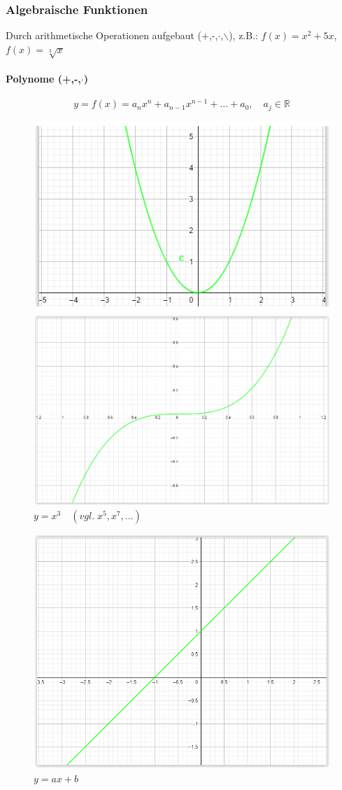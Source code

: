 \documentclass[12pt,a4paper]{report}%
\numberwithin{equation}{section}
\newcommand{\R}{\mathbb{R}} %
\newcommand{\subsubsubsection}{\paragraph}
\numberwithin{equation}{subsection}
\begin{document}
	  \subsubsection{Algebraische Funktionen}
	  Durch arithmetische Operationen aufgebaut (+,-,$\cdot$,$\backslash$), z.B.: \newline $f(x) = x^2 + 5x$, $f(x) = \sqrt[3]{x}$
    \subsubsubsection{Polynome (+,-,$\cdot$)}
    \begin{equation}
      y = f(x) = a_n x^n + a_{n-1} x^{n-1} + ... + a_0,\quad a_j \in \R
    \end{equation}  
		\vspace{-0.7cm}  	  
	  \begin{figure}[H] 
		\centering
		\begin{minipage}{.5\textwidth}
		  \centering
		  \includegraphics[width=0.7\linewidth]{funktionen_quadratisch.png}
		  \caption{$y = x^2\quad (vgl.\; x^4, x^6, ...)$}
		  \label{fig:funkt_quadr}
		\end{minipage}%
		\begin{minipage}{.5\textwidth}
		  \centering
		  \includegraphics[width=0.7\linewidth]{funktionen_kubisch.png}
		  \caption{$y = x^3 \quad (vgl.\;x^5, x^7, ...)$}
		  \label{fig:funkt_kub}
		\end{minipage}
		\end{figure}
		\vspace{-0.5cm}
		\begin{figure}[H]
		  \centering
		  \includegraphics[width=0.3\linewidth]{funktionen_linear.png}
		  \caption{$y = ax+b$}
		  \label{fig:funkt_lin}
		\end{figure}
		
\end{document}
